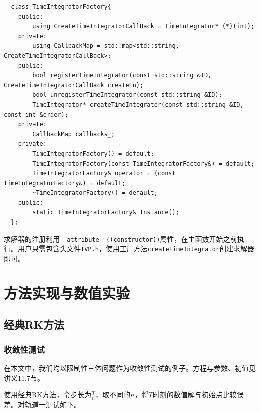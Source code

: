 \documentclass[lang=cn,10pt,bibend=bibtex]{elegantbook}
\begin{document}
\begin{lstlisting}
  class TimeIntegratorFactory{
    public:
        using CreateTimeIntegratorCallBack = TimeIntegrator* (*)(int);
    private:
        using CallbackMap = std::map<std::string, CreateTimeIntegratorCallBack>;
    public:
        bool registerTimeIntegrator(const std::string &ID, CreateTimeIntegratorCallBack createFn);
        bool unregisterTimeIntegrator(const std::string &ID);
        TimeIntegrator* createTimeIntegrator(const std::string &ID, const int &order);
    private:
        CallbackMap callbacks_;
    private:
        TimeIntegratorFactory() = default;
        TimeIntegratorFactory(const TimeIntegratorFactory&) = default;
        TimeIntegratorFactory& operator = (const TimeIntegratorFactory&) = default;
        ~TimeIntegratorFactory() = default;
    public:
        static TimeIntegratorFactory& Instance();
  };
\end{lstlisting}

求解器的注册利用\verb|__attribute__((constructor))|属性，在主函数开始之前执行。用户只需包含头文件\verb|IVP.h|，使用工厂方法\verb|createTimeIntegrator|创建求解器即可。

\chapter{方法实现与数值实验}

\section{经典RK方法}

\subsection{收敛性测试}

在本文中，我们均以限制性三体问题作为收敛性测试的例子。方程与参数、初值见讲义11.7节。

使用经典RK方法，令步长为$\frac{T}{n}$，取不同的$n$，将$T$时刻的数值解与初始点比较误差。对轨道一测试如下。
\end{document}
